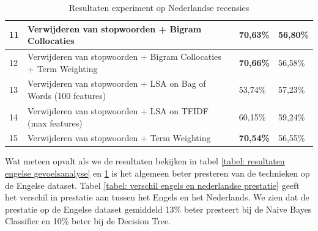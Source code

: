 \begin{table}[h]
\begin{adjustbox}{width=1\textwidth}
\begin{tabular}{|l|l|l|l|}
11       & Verwijderen van stopwoorden + Bigram Collocaties                                     & {\bf 70,63\%}                           & 56,80\%                        \\ \hline
12       & Verwijderen van stopwoorden + Bigram Collocaties + Term Weighting                    & {\bf 70,66\%}                           & 56,58\%                        \\ \hline
13       & Verwijderen van stopwoorden + LSA on Bag of Words (100 features)                     & 53,74\%                                 & 57,23\%                        \\ \hline
14       & Verwijderen van stopwoorden + LSA on TFIDF (max features)                            & 60,15\%                                 & 59,24\%                        \\ \hline
15       & Verwijderen van stopwoorden + Term Weighting                                         & {\bf 70,54\%}                           & 56,55\%                        \\ \hline
\end{tabular}
\end{adjustbox}
\label{tabel: resultaten Nederlandse gevoelsanalyse}
\caption{Resultaten experiment op Nederlandse recensies}
\end{table}


Wat meteen opvalt als we de resultaten bekijken in tabel \ref{tabel: resultaten engelse gevoelsanalyse} en \ref{tabel: resultaten Nederlandse gevoelsanalyse} is het algemeen beter presteren van de technieken op de Engelse dataset. Tabel \ref{tabel: verschil engels en nederlandse prestatie} geeft het verschil in prestatie aan tussen het Engels en het Nederlands. We zien dat de prestatie op de Engelse dataset gemiddeld 13\% beter presteert bij de Naive Bayes Classifier en 10\% beter bij de Decision Tree.


